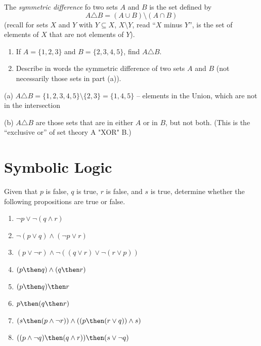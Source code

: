 \documentclass[a4paper,12pt]{article}
\begin{document}
\begin{problem}
	The \emph{symmetric difference} fo two sets $A$ and $B$ is the set defined by \[
	A \triangle B = (A \cup B) \setminus (A \cap B)
	\]
	(recall for sets $X$ and $Y$ with $Y \subseteq X$, $X \setminus Y$, read ``$X$ minus $Y$'', is the set of elements of $X$ that are not elements of $Y$). 
	\begin{enumerate}[label=(\alph*)]
		\item If $A = \{1,2,3\}$ and $B = \{2,3,4,5\}$, find $A \triangle B$. 
		\item Describe in words the symmetric difference of two sets $A$ and $B$ (not necessarily those sets in part (a)). 
	\end{enumerate} 
\end{problem}

\begin{solution}
	(a) $A \triangle B = \{1,2,3,4,5\} \setminus \{2,3\} = \{1,4,5\}$ -- elements in the Union, which are not in the intersection

	(b) $A \triangle B$ are those sets that are in either $A$ or in $B$, but not both. (This is the ``exclusive or'' of set theory A "XOR" B.)
\end{solution}

\section*{Symbolic Logic}

\begin{problem}
	Given that $p$ is false, $q$ is true, $r$ is false, and $s$ is true, determine whether the following propositions are true or false. 
	\begin{enumerate}[label=(\alph*)]
		\item $\neg p \vee \neg(q \wedge r)$
		\item $\neg(p \vee q) \wedge (\neg p \vee r)$
		\item $(p \vee \neg r) \wedge \neg ((q \vee r) \vee \neg (r \vee p))$
		\item $(p \then q) \wedge (q \then r)$
		\item $(p \then q) \then r$
		\item $p \then (q \then r)$
		\item $(s \then( p \wedge \neg r)) \wedge ((p \then (r \vee q)) \wedge s)$
		\item $((p \wedge \neg q) \then (q \wedge r)) \then (s \vee \neg q)$
	\end{enumerate} 
\end{problem}
\end{document}
